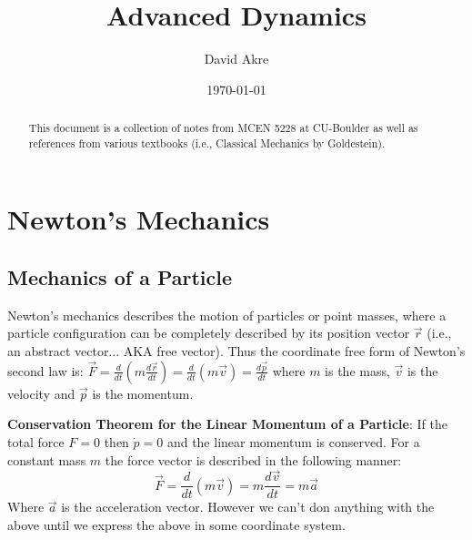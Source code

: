 \documentclass{article}
\title{Advanced Dynamics}
\author{David Akre}
\date{\today}
\begin{document}
\maketitle

\begin{abstract}
    This document is a collection of notes from MCEN 5228 at CU-Boulder as well as references from various textbooks (i.e., Classical Mechanics by Goldestein).
\end{abstract}

\section{Newton's Mechanics}

\subsection{Mechanics of a Particle}

Newton's mechanics describes the motion of particles or point masses, where a particle configuration can be completely described by its position vector $\vec{r}$ (i.e., an abstract vector... AKA free vector). Thus the coordinate free form of Newton's second law is: $\vec{F} = \frac{d}{dt}(m \frac{d\vec{r}}{dt}) = \frac{d}{dt}(m\vec{v}) = \frac{d\vec{p}}{dt}$ where $m$ is the mass, $\vec{v}$ is the velocity and $\vec{p}$ is the momentum.

\textbf{Conservation Theorem for the Linear Momentum of a Particle}: If the total force $F = 0$ then $\dot{p} = 0$ and the linear momentum is conserved. For a constant mass $m$ the force vector is described in the following manner:
\begin{equation}
    \vec{F} = \frac{d}{dt}(m \vec{v}) = m\frac{d\vec{v}}{dt} = m \vec{a}
\end{equation}
Where $\vec{a}$ is the acceleration vector. However we can't don anything with the above until we express the above in some coordinate system.
\end{document}
